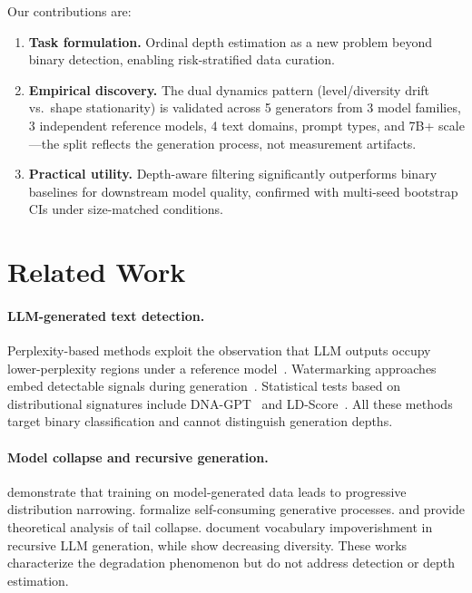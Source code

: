 \documentclass[letterpaper]{article}
\begin{document}
Our contributions are:
\begin{enumerate}
    \item \textbf{Task formulation.} Ordinal depth estimation as a new problem beyond binary detection, enabling risk-stratified data curation.
    \item \textbf{Empirical discovery.} The dual dynamics pattern (level/diversity drift vs.\ shape stationarity) is validated across 5 generators from 3 model families, 3 independent reference models, 4 text domains, prompt types, and 7B+ scale---the split reflects the generation process, not measurement artifacts.
    \item \textbf{Practical utility.} Depth-aware filtering significantly outperforms binary baselines for downstream model quality, confirmed with multi-seed bootstrap CIs under size-matched conditions.
\end{enumerate}

\section{Related Work}

\paragraph{LLM-generated text detection.}
Perplexity-based methods exploit the observation that LLM outputs occupy lower-perplexity regions under a reference model~\citep{solaiman2019release,gehrmann2019gltr,mitchell2023detectgpt,bao2024fastdetectgpt,hans2024binoculars,su2023detectllm}.
Watermarking approaches embed detectable signals during generation~\citep{kirchenbauer2023watermark,christ2024undetectable}.
Statistical tests based on distributional signatures include DNA-GPT~\citep{yang2024dnagpt} and LD-Score~\citep{tulchinskii2024ldscore}.
All these methods target binary classification and cannot distinguish generation depths.

\paragraph{Model collapse and recursive generation.}
\citet{shumailov2024model} demonstrate that training on model-generated data leads to progressive distribution narrowing.
\citet{alemohammad2024selfconsuming} formalize self-consuming generative processes.
\citet{dohmatob2024model} and \citet{gerstgrasser2024model} provide theoretical analysis of tail collapse.
\citet{guo2024curious} document vocabulary impoverishment in recursive LLM generation, while \citet{padmakumar2024does} show decreasing diversity.
These works characterize the degradation phenomenon but do not address detection or depth estimation.
\end{document}
